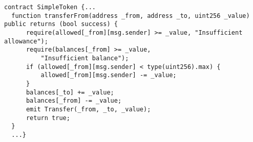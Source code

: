 \begin{lstlisting}[language=Solidity]
contract SimpleToken {...
  function transferFrom(address _from, address _to, uint256 _value) public returns (bool success) {
      require(allowed[_from][msg.sender] >= _value, "Insufficient allowance");
      require(balances[_from] >= _value, 
      	  "Insufficient balance");
      if (allowed[_from][msg.sender] < type(uint256).max) {
          allowed[_from][msg.sender] -= _value;
      }
      balances[_to] += _value;
      balances[_from] -= _value;
      emit Transfer(_from, _to, _value);
      return true;
  }    
  ...}
\end{lstlisting}